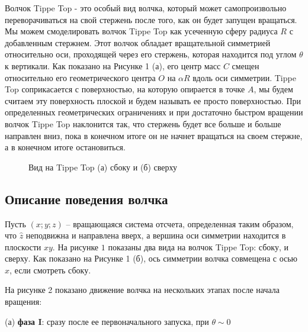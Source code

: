 \documentclass[a4paper,11.5pt]{article} %
\begin{document}
Волчок Tippe Top - это особый вид волчка, который может самопроизвольно переворачиваться на свой стержень после того, как он будет запущен вращаться. Мы можем смоделировать волчок Tippe Top как усеченную сферу радиуса $R$ с добавленным стержнем. Этот волчок обладает вращательной симметрией относительно оси, проходящей через его стержень, которая находится под углом $\theta$ к вертикали. Как показано на Рисунке 1 (а), его центр масс $C$ смещен относительно его геометрического центра $O$  на $\alpha R$ вдоль оси симметрии. Tippe Top соприкасается с поверхностью, на которую опирается в точке $A$, мы будем считаем эту поверхность плоской и будем называть ее просто поверхностью. При определенных геометрических ограничениях и при достаточно быстром вращении волчок Tippe Top наклонится так, что стержень будет все больше и больше направлен вниз, пока в конечном итоге он не начнет вращаться на своем стержне, а в конечном итоге остановиться.

\begin{figure}[h]
	\caption{ Вид на Tippe Top (а) сбоку и (б) сверху}
	\label{figimage1}
\end{figure}

\subsection{Описание поведения волчка }

Пусть $(x;y;z)$ -- вращающаяся система отсчета, определенная таким образом, что $\hat{z}$ неподвижна и направлена вверх, а вершина оси симметрии находится в плоскости $xy$. На $\textit{рисунке 1}$ показаны два вида на волчок Tippe Top: сбоку, и сверху. Как показано на Рисунке 1 (б), ось симметрии волчка совмещена с осью $x$, если смотреть сбоку. 

На рисунке 2 показано движение волчка на нескольких этапах после начала вращения:

(а) \textbf{фаза I}: сразу после ее первоначального запуска, при $\theta \sim 0$
\end{document}
